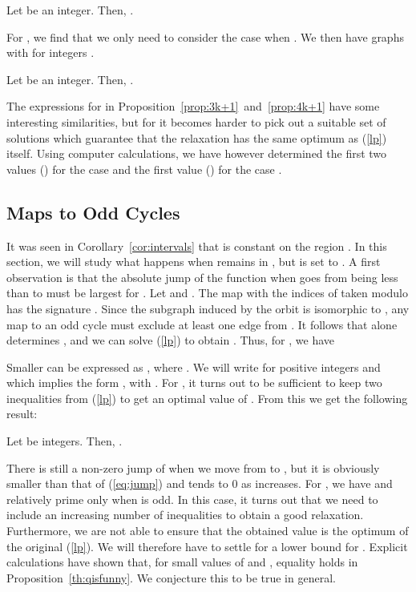 \documentclass[11pt,a4paper]{article}
\begin{document}
\begin{proposition} \label{prop:3k+1}
Let  be an integer. Then, .
\end{proposition}








For , we find that we only need to consider the case when .
We then have graphs  with  for integers .




\begin{proposition} \label{prop:4k+1}
Let  be an integer. Then, .
\end{proposition}




The expressions for  in Proposition~\ref{prop:3k+1}~and~\ref{prop:4k+1}
have some interesting similarities, but for  it becomes harder to
pick out a suitable set of solutions which guarantee that the relaxation has
the same optimum as (\ref{lp}) itself.
Using computer calculations, we have however determined the first
two values () for the case 
and the first value () for the case .


\subsection{Maps to Odd Cycles} \label{ssec:odd}

It was seen in Corollary~\ref{cor:intervals} that  is constant
on the region .
In this section, we will study what happens when  remains in , but
 is set to .
A first observation is that the absolute jump of the function
 when  goes from being less than 
to   must be largest for .
Let  and
.
The map  with the indices of  taken modulo  has the
signature .
Since the subgraph induced by the orbit  is isomorphic to ,
any map to an odd cycle must exclude at least one edge from .
It follows that  alone determines , 
and we can solve (\ref{lp}) to obtain .
Thus, for , we have

Smaller  can be expressed as , 
where .
We will write  for positive integers  and  which 
implies the form , with .
For , it turns out to be sufficient to keep two inequalities 
from (\ref{lp}) to get an optimal value of . 
From this we get the following result:





\begin{proposition} \label{prop:m1}
Let  be integers. Then, .
\end{proposition}
There is still a non-zero jump of  when we move from 
 to , but it is obviously smaller than that
of (\ref{eq:jump}) and tends to 0 as  increases.
For , we have  and  relatively prime only when 
is odd.
In this case, it turns out that we need to include an increasing number of
inequalities to obtain a good relaxation.
Furthermore, we are not able to ensure that the obtained value is the
optimum of the original (\ref{lp}).
We will therefore have to settle for a lower bound for .
Explicit calculations have shown that, for small values of  and ,
equality holds in Proposition~\ref{th:qisfunny}.
We conjecture this to be true in general.
\end{document}

